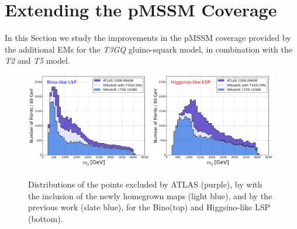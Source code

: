 \documentclass[epj,nopacs,fleqn]{svjour}
\begin{document}
\section{Extending the pMSSM Coverage}\label{sec::impact}
In this Section we study the improvements in the pMSSM coverage provided by the additional EMs for the \textit{T3GQ} gluino-squark model, in combination with the \textit{T2} and \textit{T5} model. 
\begin{figure}[!]
\begin{center}
\subfigure
{\includegraphics[width=0.49\textwidth]{PLOTS/New/BINO_Comparison_Gluino_aaa.png}}
\subfigure
{\includegraphics[width=0.49\textwidth]{PLOTS/New/HIGGSINO_Comparison_Gluino_aaa.png}}
\end{center}
\caption{Distributions of the points excluded by ATLAS (purple), by \SMO with the inclusion of the newly homegrown maps (light blue), and by the previous work \cite{Ambrogi:2017lov} (slate blue), for the Bino(top) and Higgsino-like LSP (bottom).}
\label{pmssm_new_exclusion_gluino}
\end{figure}
\\
\end{document}
